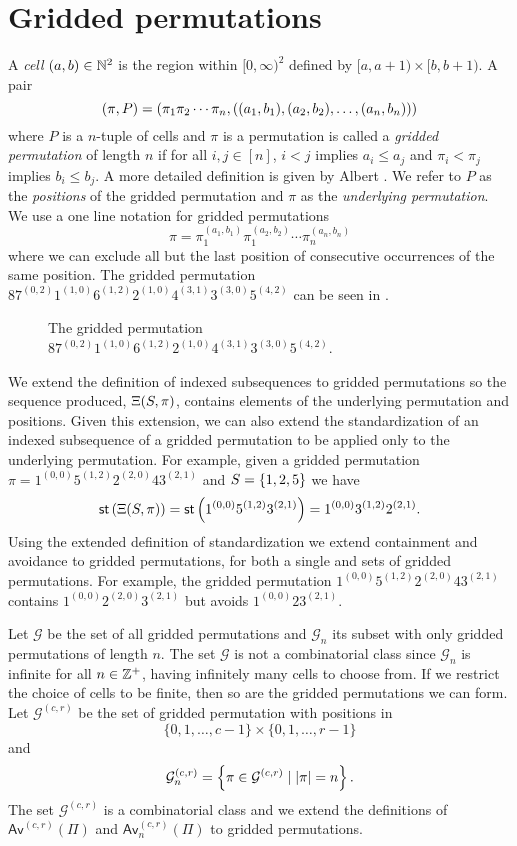 \section{Gridded permutations\label{sec:griddedpermutations}}
A \emph{cell} $(a,b) \in \mathbb{N}^2$ is the region within $[0,\infty)^2$ defined by $[a, a+1) \times [b, b+1).$ A pair
\[
    (\pi,P) = (\pi_1 \pi_2 \dotsm \pi_{n}, ((a_1,b_1),(a_2,b_2),\dotsc,(a_n,b_n)))
\]
where $P$ is a $n$-tuple of cells and $\pi$ is a permutation is called a \emph{gridded permutation} of length $n$ if for all $i,j \in [n]$, $i<j$ implies $a_i \leq a_j$ and $\pi_i < \pi_j$ implies $b_i \leq b_j$. A more detailed definition is given by Albert \cite{albert2012geometric}. We refer to $P$ as the \emph{positions} of the gridded permutation and $\pi$ as the \emph{underlying permutation}. We use a one line notation for gridded permutations 
\[
    \pi = \pi_1^{(a_1,b_1)}\pi_1^{(a_2,b_2)}\dotsb\pi_n^{(a_n,b_n)}
\]
where we can exclude all but the last position of consecutive occurrences of the same position. The gridded permutation $87^{(0,2)}1^{(1,0)}6^{(1,2)}2^{(1,0)}4^{(3,1)}3^{(3,0)}5^{(4,2)}$ can be seen in .

\begin{figure}[ht!]
    \centering
    
    \caption{The gridded permutation $87^{(0,2)}1^{(1,0)}6^{(1,2)}2^{(1,0)}4^{(3,1)}3^{(3,0)}5^{(4,2)}$.}
    \label{fig:gridded_perm}
\end{figure}

We extend the definition of indexed subsequences to gridded permutations so the sequence produced, $\Xi(S,\pi)$, contains elements of the underlying permutation and positions. Given this extension, we can also extend the standardization of an indexed subsequence of a gridded permutation to be applied only to the underlying permutation. For example, given a gridded permutation $\pi = 1^{(0,0)}5^{(1,2)}2^{(2,0)}43^{(2,1)}$ and $S=\left\{1,2,5\right\}$ we have
\[
\textsf{st}\left(\Xi(S,\pi)\right) = \textsf{st}\left(1^{(0,0)}5^{(1,2)}3^{(2,1)}\right) = 1^{(0,0)}3^{(1,2)}2^{(2,1)}.
\]
Using the extended definition of standardization we extend containment and avoidance to gridded permutations, for both a single and sets of gridded permutations. For example, the gridded permutation $1^{(0,0)}5^{(1,2)}2^{(2,0)}43^{(2,1)}$ contains $1^{(0,0)}2^{(2,0)}3^{(2,1)}$ but avoids $1^{(0,0)}23^{(2,1)}$.

Let $\mathcal{G}$ be the set of all gridded permutations and $\mathcal{G}_n$ its subset with only gridded permutations of length $n$. The set $\mathcal{G}$ is not a combinatorial class since $\mathcal{G}_n$ is infinite for all $n \in \mathbb{Z}^+$, having infinitely many cells to choose from. If we restrict the choice of cells to be finite, then so are the gridded permutations we can form. Let $\mathcal{G}^{(c,r)}$ be the set of gridded permutation with positions in 
\[
\{0,1,\dotsc,c-1\} \times \{0,1,\dotsc,r-1\}
\]
and
\[
\mathcal{G}^{(c,r)}_n = \left\{\pi \in \mathcal{G}^{(c,r)} \mid |\pi| = n\right\}.
\]
The set $\mathcal{G}^{(c,r)}$ is a combinatorial class and we extend the definitions of $\textsf{Av}^{(c,r)}\left(\Pi\right)$ and $\textsf{Av}_n^{(c,r)}\left(\Pi\right)$ to gridded permutations.

